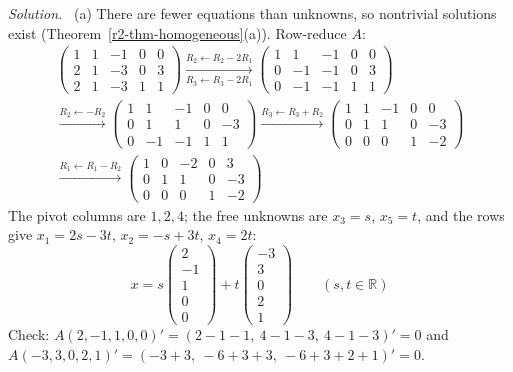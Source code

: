 \documentclass[12pt]{article}
\newcommand{\R}{\mathbb R}
\theoremstyle{definition}
\newenvironment{solution}{\par\noindent\textit{Solution.}\ }{\par\smallskip}
\begin{document}
\begin{solution}
(a) There are fewer equations than unknowns, so nontrivial solutions exist (Theorem~\ref{r2-thm-homogeneous}(a)).
Row-reduce \(A\):
\[
\begin{gathered}
\begin{pmatrix}1&1&-1&0&0\\2&1&-3&0&3\\2&1&-3&1&1\end{pmatrix}
\xrightarrow[R_3\leftarrow R_3-2R_1]{R_2\leftarrow R_2-2R_1}
\begin{pmatrix}1&1&-1&0&0\\0&-1&-1&0&3\\0&-1&-1&1&1\end{pmatrix}
\\
\xrightarrow{R_2\leftarrow-R_2}
\begin{pmatrix}1&1&-1&0&0\\0&1&1&0&-3\\0&-1&-1&1&1\end{pmatrix}
\xrightarrow{R_3\leftarrow R_3+R_2}
\begin{pmatrix}1&1&-1&0&0\\0&1&1&0&-3\\0&0&0&1&-2\end{pmatrix}
\\
\xrightarrow{R_1\leftarrow R_1-R_2}
\begin{pmatrix}1&0&-2&0&3\\0&1&1&0&-3\\0&0&0&1&-2\end{pmatrix}
\end{gathered}
\]
The pivot columns are \(1,2,4\); the free unknowns are \(x_3=s\), \(x_5=t\), and the rows give \(x_1=2s-3t\),
\(x_2=-s+3t\), \(x_4=2t\):
\[
x=s\begin{pmatrix}2\\-1\\1\\0\\0\end{pmatrix}+t\begin{pmatrix}-3\\3\\0\\2\\1\end{pmatrix}\qquad(s,t\in\R)
\]
Check: \(A(2,-1,1,0,0)'=(2-1-1,\ 4-1-3,\ 4-1-3)'=0\) and \(A(-3,3,0,2,1)'=(-3+3,\ -6+3+3,\ -6+3+2+1)'=0\).


\end{solution}
\end{document}
